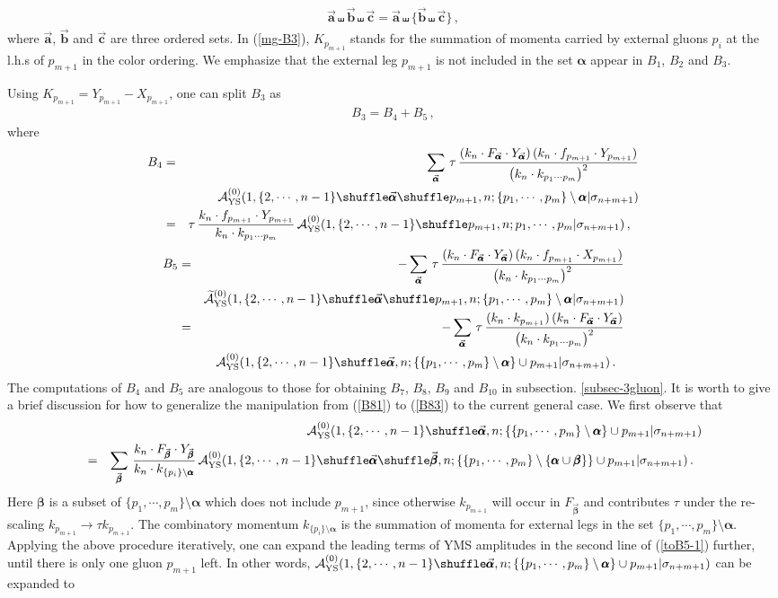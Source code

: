 \documentclass[11pt,a4paper]{article}
\newcommand{\bea}{\begin{eqnarray}}
\newcommand{\eea}{\end{eqnarray}}
\newcommand{\nn}{\nonumber \\}
\def\W #1{\widetilde{#1}}
\def\eref#1{(\ref{#1})}
\def\a{{\alpha}}
\def\b{{\beta}}
\begin{document}
%
\bea
\vec{\pmb{a}}\shuffle\vec{\pmb{b}}\shuffle\vec{\pmb{c}}=\vec{\pmb{a}}\shuffle\{\vec{\pmb{b}}\shuffle\vec{\pmb{c}}\}\,,
\eea
%
where $\vec{\pmb{a}}$, $\vec{\pmb{b}}$ and $\vec{\pmb{c}}$ are three ordered sets. In \eref{mg-B3}, $K_{p_{m+1}}$ stands for the summation of momenta carried by external gluons $p_i$ at the l.h.s of $p_{m+1}$ in the color ordering. We emphasize that the external leg $p_{m+1}$ is not included in the set $\pmb{\a}$ appear
in $B_1$, $B_2$ and $B_3$.

Using $K_{p_{m+1}}=Y_{p_{m+1}}-X_{p_{m+1}}$, one can split $B_3$ as
%
\bea
B_3=B_4+B_5\,,
\eea
%
where
%
\bea
B_4&=&\sum_{\vec{\pmb{\a}}}\,\tau\,{(k_n\cdot F_{\vec{\pmb{\a}}}\cdot Y_{\vec{\pmb{\a}}})\,(k_n\cdot f_{p_{m+1}}\cdot Y_{p_{m+1}})\over \big(k_n\cdot k_{p_1\cdots p_m}\big)^2}\nn
& &{\cal A}^{(0)}_{\rm YS}(1,\{2,\cdots,n-1\}\shuffle\vec{\pmb{\a}}\shuffle p_{m+1},n;\{p_1,\cdots,p_m\}\setminus\pmb{\a}|\sigma_{n+m+1})\nn
&=&\tau\,{k_n\cdot f_{p_{m+1}}\cdot Y_{p_{m+1}}\over k_n\cdot k_{p_1\cdots p_m}}\,{\cal A}^{(0)}_{\rm YS}(1,\{2,\cdots,n-1\}\shuffle p_{m+1},n;p_1,\cdots,p_m|\sigma_{n+m+1})\,,~~\label{mg-B4}
\eea
%
%
\bea
B_5&=&-\sum_{\vec{\pmb{\a}}}\,\tau\,{(k_n\cdot F_{\vec{\pmb{\a}}}\cdot Y_{\vec{\pmb{\a}}})\,(k_n\cdot f_{p_{m+1}}\cdot X_{p_{m+1}})\over \big(k_n\cdot k_{p_1\cdots p_m}\big)^2}\nn
& &\W{\cal A}^{(0)}_{\rm YS}(1,\{2,\cdots,n-1\}\shuffle\vec{\pmb{\a}}\shuffle p_{m+1},n;\{p_1,\cdots,p_m\}\setminus\pmb{\a}|\sigma_{n+m+1})\nn
&=&-\sum_{\vec{\pmb{\a}}}\,\tau\,{(k_n\cdot k_{p_{m+1}})\,(k_n\cdot F_{\vec{\pmb{\a}}}\cdot Y_{\vec{\pmb{\a}}})\over \big(k_n\cdot k_{p_1\cdots p_m}\big)^2}\nn
& &{\cal A}^{(0)}_{\rm YS}(1,\{2,\cdots,n-1\}\shuffle\vec{\pmb{\a}},n;\{\{p_1,\cdots,p_m\}\setminus\pmb{\a}\}\cup p_{m+1}|\sigma_{n+m+1})\,.~~\label{mg-B5}
\eea
%
The computations of $B_4$ and $B_5$ are analogous to those for obtaining $B_7$, $B_8$, $B_9$ and $B_{10}$ in subsection. \ref{subsec-3gluon}. It is worth to give a brief discussion for how to generalize the manipulation from \eref{B81} to \eref{B83} to the current general case. We first observe that
%
\bea
& &{\cal A}^{(0)}_{\rm YS}(1,\{2,\cdots,n-1\}\shuffle\vec{\pmb{\a}},n;\{\{p_1,\cdots,p_m\}\setminus\pmb{\a}\}\cup p_{m+1}|\sigma_{n+m+1})\nn
&=&\sum_{\vec{\pmb{\b}}}\,{k_n\cdot F_{\vec{\pmb{\b}}}\cdot Y_{\vec{\pmb{\b}}}\over k_n\cdot k_{\{p_i\}\setminus\pmb{\a}}}\,
{\cal A}^{(0)}_{\rm YS}(1,\{2,\cdots,n-1\}\shuffle\vec{\pmb{\a}}\shuffle\vec{\pmb{\b}},n;\{\{p_1,\cdots,p_m\}\setminus\{\pmb{\a}\cup\pmb{\b}\}\}\cup p_{m+1}|\sigma_{n+m+1})\,.
~~\label{toB5-1}
\eea
%
Here $\pmb{\b}$ is a subset of $\{p_1,\cdots,p_m\}\setminus\pmb{\a}$ which does not include $p_{m+1}$, since otherwise $k_{p_{m+1}}$ will occur in $F_{\vec{\pmb{\b}}}$ and contributes $\tau$ under the re-scaling $k_{p_{m+1}}\to\tau k_{p_{m+1}}$. The combinatory momentum $k_{\{p_i\}\setminus\pmb{\a}}$ is the summation of momenta for external legs in the set $\{p_1,\cdots,p_m\}\setminus\pmb{\a}$. Applying the above procedure iteratively, one can expand the leading terms of YMS amplitudes in the second line of \eref{toB5-1} further, until there is only one gluon $p_{m+1}$ left. In other words, ${\cal A}^{(0)}_{\rm YS}(1,\{2,\cdots,n-1\}\shuffle\vec{\pmb{\a}},n;\{\{p_1,\cdots,p_m\}\setminus\pmb{\a}\}\cup p_{m+1}|\sigma_{n+m+1})$ can be expanded to
\end{document}
